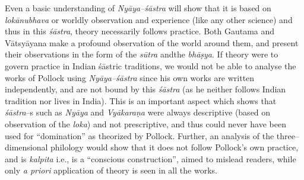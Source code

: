 Even a basic understanding of \textit{Nyāya–śāstra} will show that it is based on \textit{lokānubhava} or worldly observation and experience (like any other science) and thus in this \textit{śāstra}, theory necessarily follows practice. Both Gautama and Vātsyāyana make a profound observation of the world around them, and present their observations in the form of the \textit{sūtra} andthe\textit{ bhāṣya}. If theory were to govern practice in Indian śāstric traditions, we would not be able to analyse the works of Pollock using \textit{Nyāya–śāstra} since his own works are written independently, and are not bound by this \textit{śāstra }(as he neither follows Indian tradition nor lives in India). This is an important aspect which shows that \textit{śāstra}–s such as \textit{Nyāya} and \textit{Vyākaraṇa} were always descriptive (based on observation of the \textit{loka}) and not prescriptive, and thus could never have been used for “domination” as theorized by Pollock. Further, an analysis of the three–dimensional philology would show that it does not follow Pollock’s own practice, and is \textit{kalpita} i.e., is a “conscious construction”, aimed to mislead readers, while only \textit{a priori} application of theory is seen in all the works.

